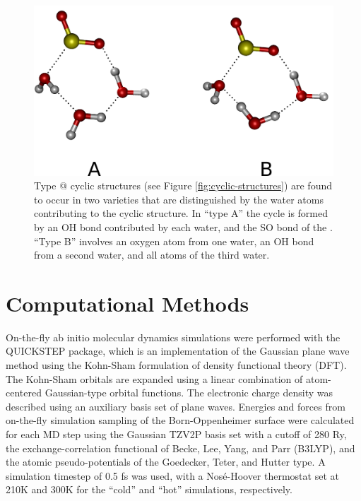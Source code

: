 \documentclass{article}
\makeatletter
\newcommand{\Rmnum}[1]{\expandafter\@slowromancap\romannumeral #1@}
\makeatother
\begin{document}
\begin{figure}[h!]
	\begin{center}
		\includegraphics[scale=1.0]{triple-cycle-types-small.png}
		\caption{Type \Rmnum{3} cyclic structures (see Figure \ref{fig:cyclic-structures}) are found to occur in two varieties that are distinguished by the water atoms contributing to the cyclic structure. In ``type A'' the cycle is formed by an OH bond contributed by each water, and the SO bond of the \suldiox. ``Type B'' involves an oxygen atom from one water, an OH bond from a second water, and all atoms of the third water.}
		\label{fig:type-3-varieties}
	\end{center}
\end{figure}


\section{Computational Methods}

On-the-fly ab initio molecular dynamics simulations were performed with the QUICKSTEP package, which is an implementation of the Gaussian plane wave method using the Kohn-Sham formulation of density functional theory (DFT).\cite{VandeVondele2005} The Kohn-Sham orbitals are expanded using a linear combination of atom-centered Gaussian-type orbital functions. The electronic charge density was described using an auxiliary basis set of plane waves. Energies and forces from on-the-fly simulation sampling of the Born-Oppenheimer surface were calculated for each MD step using the Gaussian TZV2P basis set with a cutoff of 280 Ry, the exchange-correlation functional of Becke, Lee, Yang, and Parr (B3LYP),\cite{LEE1988} and the atomic pseudo-potentials of the Goedecker, Teter, and Hutter type.\cite{Goedecker1996} A simulation timestep of 0.5 fs was used, with a Nos\'{e}-Hoover thermostat set at 210K and 300K for the ``cold'' and ``hot'' simulations, respectively. %
\end{document}
